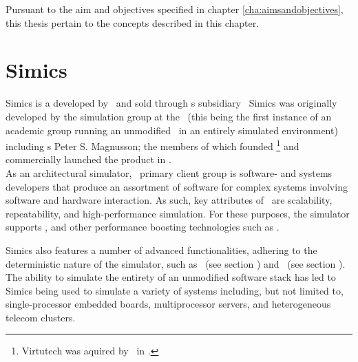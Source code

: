 \noindent
Pursuant to the aim and objectives specified in chapter \ref{cha:aimsandobjectives}, this thesis pertain to the concepts described in this chapter.

\section*{Simics}
\label{sec:background_simics}
Simics is a  developed by \dvttermintel\ and sold through \dvttermintel s subsidiary \dvttermwindriver\
Simics was originally developed by the simulation group at the \dvttermsics\ (this being the first instance of an academic group running an unmodified \dvttermos\ in an entirely simulated environment) including \dvttermgoogle s Peter S. Magnusson; the members of which founded \dvttermvirtutech \footnote{Virtutech was aquired by \dvttermintel\ in .} and commercially launched the product in .\\

\noindent
As an architectural simulator, \dvttermsimics\ primary client group is software- and systems developers that produce an assortment of software for complex systems involving software and hardware interaction.
As such, key attributes of \dvttermsimics\ are scalability, repeatability, and high-performance simulation.
For these purposes, the simulator supports \dvttermhostvirtualizationextensions , and other performance boosting technologies such as \dvttermhypersimulation {}.

Simics also features a number of advanced functionalities, adhering to the deterministic nature of the simulator, such as \dvttermcheckpointing\ (see section ) and \dvttermreverseexecution\ (see section ).\\

\noindent
The ability to simulate the entirety of an unmodified software stack has led to Simics being used to simulate a variety of systems including, but not limited to, single-processor embedded boards, multiprocessor servers, and heterogeneous telecom clusters.

